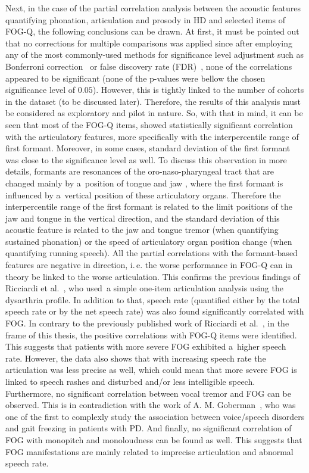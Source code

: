 Next, in the case of the partial correlation analysis between the acoustic features quantifying phonation, articulation and prosody in HD and selected items of FOG-Q, the following conclusions can be drawn. At first, it must be pointed out that no corrections for multiple comparisons was applied since after employing any of the most commonly-used methods for significance level adjustment such as Bonferroni correction~\cite{Weisstein2004} or false discovery rate (FDR)~\cite{Storey2011}, none of the correlations appeared to be significant (none of the p-values were bellow the chosen significance level of $0.05$). However, this is tightly linked to the number of cohorts in the dataset (to be discussed later). Therefore, the results of this analysis must be considered as exploratory and pilot in nature. So, with that in mind, it can be seen that most of the FOG-Q items, showed statistically significant correlation with the articulatory features, more specifically with the interpercentile range of first formant. Moreover, in some cases, standard deviation of the first formant was close to the significance level as well. To discuss this observation in more details, formants are resonances of the oro-naso-pharyngeal tract that are changed mainly by a~position of tongue and jaw \cite{Gomez2017, Gomez2017b, Vergara2017}, where the first formant is influenced by a~vertical position of these articulatory organs. Therefore the interpercentile range of the first formant is related to the limit positions of the jaw and tongue in the vertical direction, and the standard deviation of this acoustic feature is related to the jaw and tongue tremor (when quantifying sustained phonation) or the speed of articulatory organ position change (when quantifying running speech). All the partial correlations with the formant-based features are negative in direction, i.\,e. the worse performance in FOG-Q can in theory be linked to the worse articulation. This confirms the previous findings of Ricciardi et al.~\cite{Ricciardi2016}, who used~a simple one-item articulation analysis using the dysarthria profile. In addition to that, speech rate  (quantified either by the total speech rate or by the net speech rate) was also found significantly correlated with FOG. In contrary to the previously published work of Ricciardi et al.~\cite{Ricciardi2016}, in the frame of this thesis, the positive correlations with FOG-Q items were identified. This suggests that patients with more severe FOG exhibited a~higher speech rate. However, the data also shows that with increasing speech rate the articulation was less precise as well, which could mean that more severe FOG is linked to speech rashes and disturbed and/or less intelligible speech. Furthermore, no significant correlation between vocal tremor and FOG can be observed. This is in contradiction with the work of A. M. Goberman~\cite{Goberman2005b}, who was one of the first to complexly study the association between voice/speech disorders and gait freezing in patients with PD. And finally, no significant correlation of FOG with monopitch and monoloudness can be found as well. This suggests that FOG manifestations are mainly related to imprecise articulation and abnormal speech rate.

